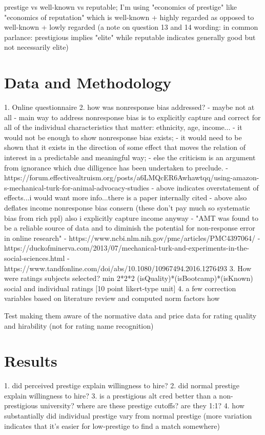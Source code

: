 \documentclass[review]{elsarticle}
\begin{document}
prestige vs well-known vs reputable; I'm using "economics of prestige" like "economics of reputation"
which is well-known + highly regarded
as opposed to well-known + lowly regarded
(a note on question 13 and 14 wording:
in common parlance: prestigious implies "elite" while reputable indicates generally good but not necessarily elite)

\section{Data and Methodology}

1. Online questionnaire
2. how was nonresponse bias addressed? - maybe not at all
- main way to address nonresponse bias is to explicitly capture and correct for all of the individual characteristics that matter: ethnicity, age, income...
- it would not be enough to show nonresponse bias exists;
- it would need to be shown that it exists in the direction of some effect that moves the relation of interest in a predictable and meaningful way;
- else the criticism is an argument from ignorance which due dilligence has been undertaken to preclude.
- https://forum.effectivealtruism.org/posts/a6LMQcER6Awhawtqq/using-amazon-s-mechanical-turk-for-animal-advocacy-studies
- above indicates overstatement of effects...i would want more info...there is a paper internally cited
- above also deflates income nonresponse bias consern (these don't pay much so systematic bias from rich ppl) also i explicitly capture income anyway
- "AMT was found to be a reliable source of data and to diminish the potential for non-response error in online research"
- https://www.ncbi.nlm.nih.gov/pmc/articles/PMC4397064/
- https://duckofminerva.com/2013/07/mechanical-turk-and-experiments-in-the-social-sciences.html
- https://www.tandfonline.com/doi/abs/10.1080/10967494.2016.1276493
3. How were ratings subjects selected? min 2*2*2 (isQuality)*(isBootcamp)*(isKnown) social and individual ratings [10 point likert-type unit]
4. a few correction variables based on literature review and computed norm factors how

Test making them aware of the normative data and price data for rating quality and hirability (not for rating name recognition)

\section{Results}

1. did perceived prestige explain willingness to hire?
2. did normal prestige explain willingness to hire?
3. is a prestigious alt cred better than a non-prestigious university? where are these prestige cutoffs? are they 1:1?
4. how substantially did individual prestige vary from normal prestige (more variation indicates that it's easier for low-prestige to find a match somewhere)
\end{document}
